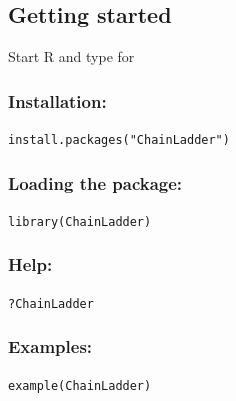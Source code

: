 \documentclass[a4paper]{article}
\begin{document}
\subsection{Getting started}
Start R and type for
\subsubsection{Installation:}
\texttt{install.packages("ChainLadder")}
\subsubsection{Loading the package:}
\texttt{library(ChainLadder)}
\subsubsection{Help:}
\texttt{?ChainLadder}
\subsubsection{Examples:}
\texttt{example(ChainLadder)}
\end{document}
